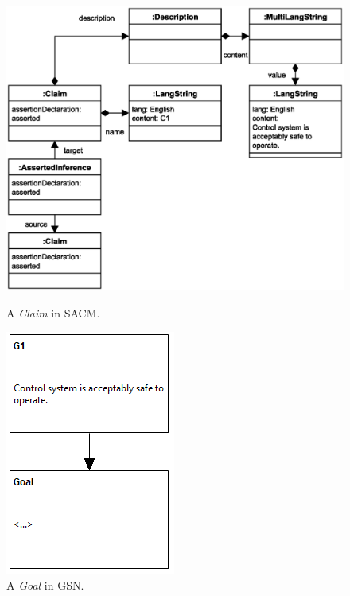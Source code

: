 \begin{figure}
	\centering
	\begin{minipage}[b]{0.7\textwidth}
		\includegraphics[width=\textwidth]{fig/assertedClaim.eps}
		\caption{A \textit{Claim} in SACM.}
		\label{fig:assertedClaim}
	\end{minipage}
	\hfill
	\begin{minipage}[b]{0.28\textwidth}
		\includegraphics[width=\textwidth]{fig/goal_asserted.png}
		\caption{A \textit{Goal} in GSN.}
		\label{fig:goalingsn}
	\end{minipage}
\end{figure}
